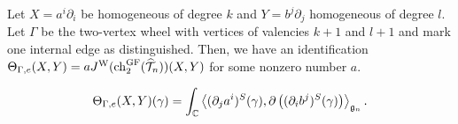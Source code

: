 \begin{prop}
Let $X = a^i \partial_i$ be homogeneous of degree $k$
and $Y = b^j \partial_j$ homogeneous of degree $l$. Let $\Gamma$ be the two-vertex wheel with vertices of valencies $k+1$ and $l+1$ and mark one internal edge as distinguished. Then, we have an identification $\Theta_{\Gamma,e}(X,Y) = a J^{\rm W}({\rm ch}_2^{\rm GF} (\widehat{\mathcal T}_n))(X,Y)$ for some nonzero number $a$. 
\end{prop}

\[
\Theta_{\Gamma,e}(X,Y)(\gamma) = \int_\mathbb C \left\langle(\partial_j a^i)^S(\gamma), \partial\left( (\partial_i
b^j)^S(\gamma)\right)\right\rangle_{\mathfrak{g}_n}.
\]
 


